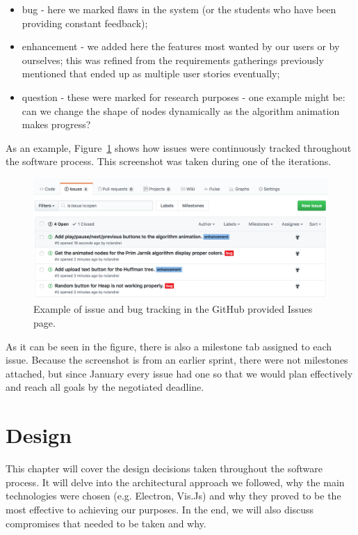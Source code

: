 \documentclass{l4proj}
\begin{document}
\begin{itemize}
    \item bug - here we marked flaws in the system (or the students who have been providing constant feedback);
    \item enhancement - we added here the features most wanted by our users or by ourselves; this was refined from the
	requirements gatherings previously mentioned that ended up as multiple user stories eventually;
    \item question - these were marked for research purposes - one example might be: can we change the shape of nodes
	dynamically as the algorithm animation makes progress?
\end{itemize}

As an example, Figure~\ref{fig:issue-tracking} shows how issues were continuously tracked throughout the software process.
This screenshot was taken during one of the iterations.

\begin{figure}[!ht]
    \centering
    \includegraphics[scale=0.5]{issue-tracking}
    \caption{Example of issue and bug tracking in the GitHub provided Issues page.}
    \label{fig:issue-tracking}
\end{figure}

As it can be seen in the figure, there is also a milestone tab assigned to each issue. Because the screenshot is
from an earlier sprint, there were not milestones attached, but since January every issue had one so that we
would plan effectively and reach all goals by the negotiated deadline.


\chapter{Design}
\label{design}

This chapter will cover the design decisions taken throughout the software process. It will delve into the
architectural approach we followed, why the main
technologies were chosen (e.g. Electron, Vis.Js) and why they proved to be the most effective to achieving
our purposes. In the end, we will also discuss compromises that needed to be taken and why.
\end{document}
